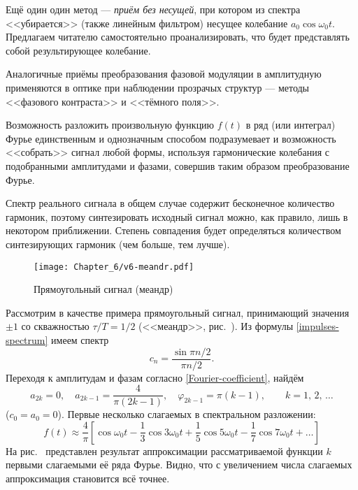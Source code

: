 Ещё один один метод --- \emph{приём без несущей}, при котором из
спектра <<убирается>> (также линейным фильтром)
несущее колебание $a_0\cos\omega_0t$. Предлагаем читателю самостоятельно
проанализировать, что будет представлять собой результирующее колебание.

Аналогичные приёмы преобразования фазовой модуляции в амплитудную
применяются в оптике при наблюдении прозрачых структур ---
методы <<фазового контраста>> и <<тёмного поля>>.


\label{sec:synth}

Возможность разложить произвольную функцию $f(t)$ в ряд (или интеграл)
Фурье единственным и однозначным способом подразумевает и возможность
<<собрать>> сигнал любой формы, используя гармонические колебания с подобранными
амплитудами и фазами, совершив таким образом  преобразование Фурье.

Спектр реального сигнала в общем случае содержит бесконечное количество
гармоник, поэтому синтезировать исходный сигнал можно, как правило,
лишь в некотором приближении. Степень совпадения будет определяться
количеством синтезирующих гармоник (чем больше, тем лучше).

\begin{figure}[h!]
 \centering\texttt{[image: Chapter\_6/v6-meandr.pdf]}
 \caption{Прямоугольный сигнал (меандр)}
\end{figure}

Рассмотрим в качестве примера прямоугольный сигнал, принимающий
значения $\pm 1$ со скважностью $\tau/T=1/2$ (<<меандр>>,
рис.~). Из формулы \eqref{impulses-spectrum} имеем спектр
\begin{equation*}
c_n = \frac{\sin \pi n/2}{\pi n/2}.
\end{equation*}
Переходя к амплитудам и фазам согласно \eqref{Fourier-coefficient},
найдём
\begin{equation*}
a_{2k}=0,\quad a_{2k-1} = \frac{4}{\pi (2k-1)},\quad
\varphi_{2k-1} = \pi (k-1),\qquad k=1,\,2,\,\ldots
\end{equation*}
($c_0=a_0=0$). Первые несколько слагаемых в спектральном разложении:
\begin{equation*}
f(t) \approx \frac{4}{\pi} \left[ \cos \omega_0 t -
\frac{1}{3}\cos 3\omega_0 t +
\frac{1}{5}\cos 5\omega_0 t -
\frac{1}{7}\cos 7\omega_0 t + \ldots\right]
\end{equation*}
На рис.~ представлен результат аппроксимации
рассматриваемой функции $k$ первыми слагаемыми её ряда Фурье.
Видно, что с увеличением числа слагаемых аппроксимация становится всё точнее.

